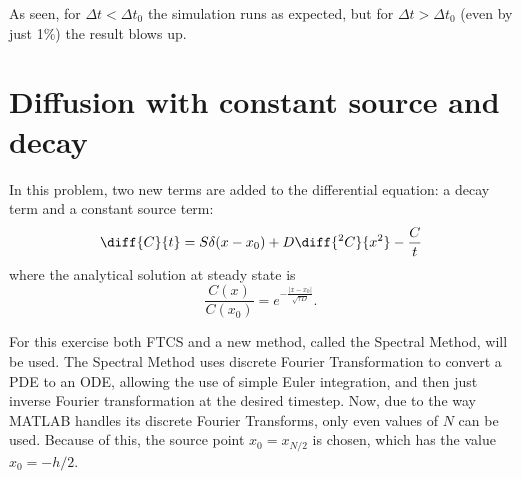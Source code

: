 \documentclass[a4paper,10pt]{article} 	%
\numberwithin{equation}{section}
\begin{document}
	As seen, for $ \Delta t < \Delta t_0 $ the simulation runs as expected, but for $ \Delta t > \Delta t_0 $ (even by just 1\%) the result blows up.



	\section{Diffusion with constant source and decay}
	In this problem, two new terms are added to the differential equation: a decay term and a constant source term:
	\begin{equation}\label{key}
		\diff{C}{t} = S \delta(x-x_0) + D \diff{^2 C}{x^2}- \frac{C}{t}
	\end{equation}
	where the analytical solution at steady state is
	\begin{equation}\label{key}
		\frac{C(x)}{C(x_0)} = e^{-\frac{|x-x_0|}{\sqrt{\tau D}}}.
	\end{equation}
	
	For this exercise both FTCS and a new method, called the Spectral Method, will be used. The Spectral Method uses discrete Fourier Transformation to convert a PDE to an ODE, allowing the use of simple Euler integration, and then just inverse Fourier transformation at the desired timestep. Now, due to the way MATLAB handles its discrete Fourier Transforms, only even values of $ N $ can be used. Because of this, the source point $ x_0 = x_{N/2} $ is chosen, which has the value $ x_0 = -h/2 $.
	
	
\end{document}
